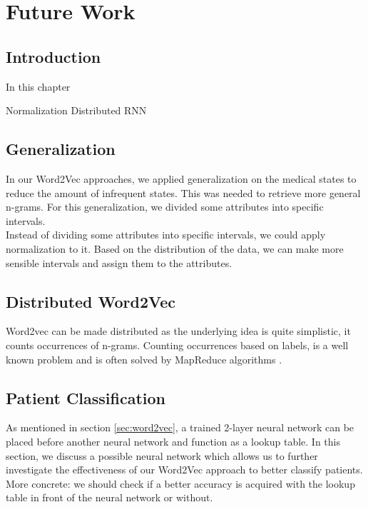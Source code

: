 \graphicspath{ {FutureWork/Images/} }


\chapter{Future Work}
\label{cha:futureWork}

\section{Introduction}
In this chapter 

Normalization
Distributed
RNN


\section{Generalization}

In our Word2Vec approaches, we applied generalization on the medical states to reduce the amount of infrequent states. This was needed to retrieve more general n-grams. For this generalization, we divided some attributes into specific intervals. \\

Instead of dividing some attributes into specific intervals, we could apply normalization to it. Based on the distribution of the data, we can make more sensible intervals and assign them to the attributes.


\section{Distributed Word2Vec}

Word2vec can be made distributed as the underlying idea is quite simplistic, it counts occurrences of n-grams. Counting occurrences based on labels, is a well known problem and is often solved by MapReduce algorithms \cite{mapreduce:article}. 


\section{Patient Classification}
\label{sec:PatientClassification}

As mentioned in section \ref{sec:word2vec}, a trained 2-layer neural network can be placed before another neural network and function as a lookup table. In this section, we discuss a possible neural network which allows us to further investigate the effectiveness of our Word2Vec approach to better classify patients. More concrete: we should check if a better accuracy is acquired with the lookup table in front of the neural network or without. 

